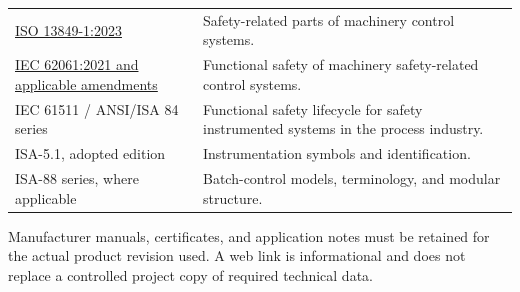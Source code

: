 \begin{longtable}{@{}p{4.2cm}p{8.6cm}@{}}
\href{https://www.iso.org/standard/73481.html}{ISO 13849-1:2023} & Safety-related parts of machinery control systems.\\
\href{https://webstore.iec.ch/en/publication/59927}{IEC 62061:2021 and applicable amendments} & Functional safety of machinery safety-related control systems.\\
IEC 61511 / ANSI/ISA 84 series & Functional safety lifecycle for safety instrumented systems in the process industry.\\
ISA-5.1, adopted edition & Instrumentation symbols and identification.\\
ISA-88 series, where applicable & Batch-control models, terminology, and modular structure.\\
\bottomrule
\end{longtable}

Manufacturer manuals, certificates, and application notes must be retained for the actual product revision used. A web link is informational and does not replace a controlled project copy of required technical data.
